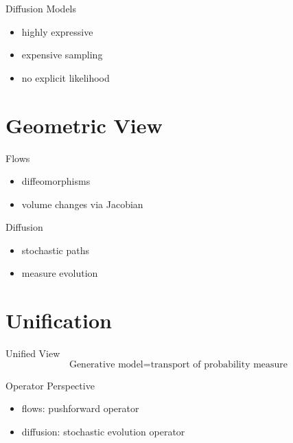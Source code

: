 \documentclass{beamer}
\begin{document}
\begin{frame}{Diffusion Models}
\begin{itemize}
\item highly expressive
\item expensive sampling
\item no explicit likelihood
\end{itemize}
\end{frame}

\section{Geometric View}

\begin{frame}{Flows}
\begin{itemize}
\item diffeomorphisms
\item volume changes via Jacobian
\end{itemize}
\end{frame}


\begin{frame}{Diffusion}
\begin{itemize}
\item stochastic paths
\item measure evolution
\end{itemize}
\end{frame}

\section{Unification}

\begin{frame}{Unified View}
\[
\text{Generative model} = \text{transport of probability measure}
\]
\end{frame}


\begin{frame}{Operator Perspective}
\begin{itemize}
\item flows: pushforward operator
\item diffusion: stochastic evolution operator
\end{itemize}
\end{frame}
\end{document}
